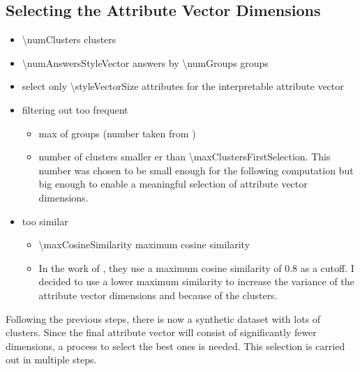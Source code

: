 \subsection{Selecting the Attribute Vector Dimensions}
\label{sec:experiments_evaluation:selection}
\begin{itemize}
  \item \num{\numClusters} clusters
  \item \num{\numAnswersStyleVector} answers by \num{\numGroups} groups
  \item select only \num{\styleVectorSize} attributes for the interpretable attribute vector
  \item filtering out too frequent
        \begin{itemize}
          \item max \clusterMaxGroupRatioText{} of groups (number taken from \citet{patelLearningInterpretableStyle2023})
          \item number of clusters smaller er than \num{\maxClustersFirstSelection}. This number was chosen to be small enough for the following computation but big enough to enable a meaningful selection of attribute vector dimensions.
        \end{itemize}
  \item too similar
        \begin{itemize}
          \item \num{\maxCosineSimilarity} maximum cosine similarity
          \item In the work of \citeauthor{patelLearningInterpretableStyle2023}, they use a maximum cosine similarity of \num{0.8} as a cutoff. I decided to use a lower maximum similarity to increase the variance of the attribute vector dimensions and because of the clusters. %
        \end{itemize}
\end{itemize}

\begin{figure}[ht]
  \begin{center}
    
  \end{center}
\end{figure}


Following the previous steps, there is now a synthetic dataset with lots of clusters. Since the final attribute vector will consist of significantly fewer dimensions, a process to select the best ones is needed. This selection is carried out in multiple steps.

